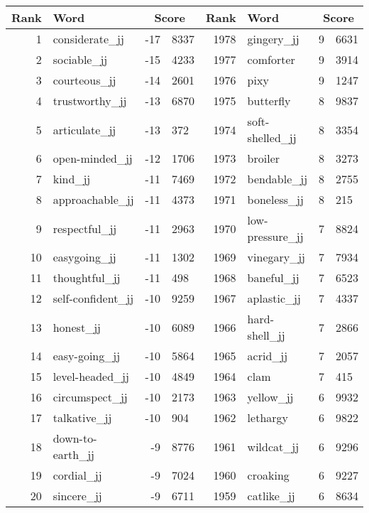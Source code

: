 \begin{table}[tbp]
    \begin{tabular}{| rlr@{.}l | rlr@{.}l |}
    \hline
    \textbf{Rank} & \textbf{Word} & \multicolumn{2}{c|}{\textbf{Score}} & \textbf{Rank} & \textbf{Word} & \multicolumn{2}{c|}{\textbf{Score}} \\
    \hline
    1 & considerate\_jj & -17 & 8337    &    1978 & gingery\_jj & 9 & 6631 \\
    2 & sociable\_jj & -15 & 4233    &    1977 & comforter & 9 & 3914 \\
    3 & courteous\_jj & -14 & 2601    &    1976 & pixy & 9 & 1247 \\
    4 & trustworthy\_jj & -13 & 6870    &    1975 & butterfly & 8 & 9837 \\
    5 & articulate\_jj & -13 & 372    &    1974 & soft-shelled\_jj & 8 & 3354 \\
    6 & open-minded\_jj & -12 & 1706    &    1973 & broiler & 8 & 3273 \\
    7 & kind\_jj & -11 & 7469    &    1972 & bendable\_jj & 8 & 2755 \\
    8 & approachable\_jj & -11 & 4373    &    1971 & boneless\_jj & 8 & 215 \\
    9 & respectful\_jj & -11 & 2963    &    1970 & low-pressure\_jj & 7 & 8824 \\
    10 & easygoing\_jj & -11 & 1302    &    1969 & vinegary\_jj & 7 & 7934 \\
    11 & thoughtful\_jj & -11 & 498    &    1968 & baneful\_jj & 7 & 6523 \\
    12 & self-confident\_jj & -10 & 9259    &    1967 & aplastic\_jj & 7 & 4337 \\
    13 & honest\_jj & -10 & 6089    &    1966 & hard-shell\_jj & 7 & 2866 \\
    14 & easy-going\_jj & -10 & 5864    &    1965 & acrid\_jj & 7 & 2057 \\
    15 & level-headed\_jj & -10 & 4849    &    1964 & clam & 7 & 415 \\
    16 & circumspect\_jj & -10 & 2173    &    1963 & yellow\_jj & 6 & 9932 \\
    17 & talkative\_jj & -10 & 904    &    1962 & lethargy & 6 & 9822 \\
    18 & down-to-earth\_jj & -9 & 8776    &    1961 & wildcat\_jj & 6 & 9296 \\
    19 & cordial\_jj & -9 & 7024    &    1960 & croaking & 6 & 9227 \\
    20 & sincere\_jj & -9 & 6711    &    1959 & catlike\_jj & 6 & 8634 \\

\end{tabular}
\end{table}
